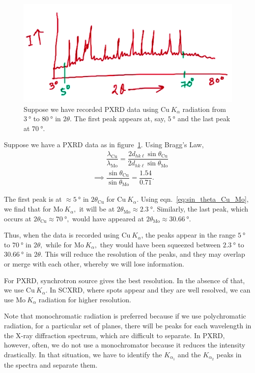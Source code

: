 \begin{figure}
	\centering
	\includegraphics[width=\textwidth]{pxrd_peaks.png}
	\caption{\label{fig:pxrd_peaks}Suppose we have recorded PXRD data using $\mathrm{Cu}~K_\alpha$ radiation from $\SI{3}{\degree}$ to $\SI{80}{\degree}$ in $2\theta$. The first peak appears at, say, $\SI{5}{\degree}$ and the last peak at $\SI{70}{\degree}.$}
\end{figure}

Suppose we have a PXRD data as in figure~\ref{fig:pxrd_peaks}. Using Bragg's Law,%
%
\begin{align}
&\phantom{\implies} \dfrac{\lambda_\mathrm{Cu}}{\lambda_\mathrm{Mo}} = \dfrac{2 d_{hk\ell} \sin \theta_\mathrm{Cu}}{2 d_{hk\ell} \sin \theta_\mathrm{Mo}} \nonumber \\[0.8em]
&\implies \dfrac{\sin \theta_\mathrm{Cu}}{\sin \theta_\mathrm{Mo}} = \dfrac{1.54}{0.71}. \label{eq:sin_theta_Cu_Mo}
\end{align}

The first peak is at $\approx \SI{5}{\degree}$ in $2\theta_\mathrm{Cu}$ for $\mathrm{Cu}~K_\alpha$. Using eqn.~\eqref{eq:sin_theta_Cu_Mo}, we find that for $\mathrm{Mo}~K_\alpha,$ it will be at $2\theta_\mathrm{Mo} \approx \SI{2.3}{\degree}.$ Similarly, the last peak, which occurs at $2\theta_\mathrm{Cu} \approx \SI{70}{\degree},$ would have appeared at $2\theta_\mathrm{Mo} \approx \SI{30.66}{\degree}.$

Thus, when the data is recorded using $\mathrm{Cu}~K_\alpha$, the peaks appear in the range $\SI{5}{\degree}$ to $\SI{70}{\degree}$ in $2\theta,$ while for $\mathrm{Mo}~K_\alpha,$ they would have been squeezed between $\SI{2.3}{\degree}$ to $\SI{30.66}{\degree}$ in $2\theta.$ This will reduce the resolution of the peaks, and they may overlap or merge with each other, whereby we will lose information.

For PXRD, synchrotron source gives the best resolution. In the absence of that, we use $\mathrm{Cu}~K_\alpha.$ In SCXRD, where spots appear and they are well resolved, we can use $\mathrm{Mo}~K_\alpha$ radiation for higher resolution.

Note that monochromatic radiation is preferred because if we use polychromatic radiation, for a particular set of planes, there will be peaks for each wavelength in the X-ray diffraction spectrum, which are difficult to separate. In PXRD, however, often, we do not use a monochromator because it reduces the intensity drastically. In that situation, we have to identify the $K_{\alpha_1}$ and the $K_{\alpha_2}$ peaks in the spectra and separate them.